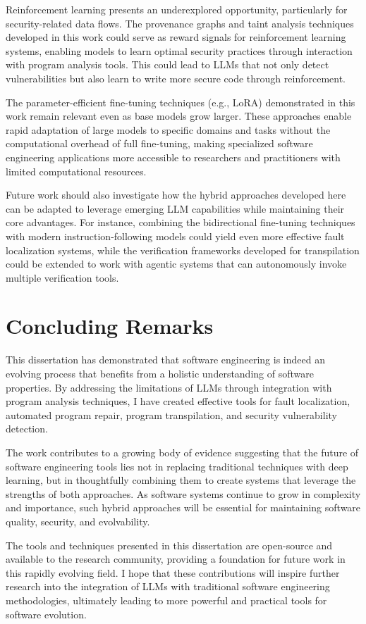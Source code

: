 Reinforcement learning presents an underexplored opportunity, particularly for security-related data flows. The provenance graphs and taint analysis techniques developed in this work could serve as reward signals for reinforcement learning systems, enabling models to learn optimal security practices through interaction with program analysis tools. This could lead to LLMs that not only detect vulnerabilities but also learn to write more secure code through reinforcement.

The parameter-efficient fine-tuning techniques (e.g., LoRA) demonstrated in this work remain relevant even as base models grow larger. These approaches enable rapid adaptation of large models to specific domains and tasks without the computational overhead of full fine-tuning, making specialized software engineering applications more accessible to researchers and practitioners with limited computational resources.

Future work should also investigate how the hybrid approaches developed here can be adapted to leverage emerging LLM capabilities while maintaining their core advantages. For instance, combining the bidirectional fine-tuning techniques with modern instruction-following models could yield even more effective fault localization systems, while the verification frameworks developed for transpilation could be extended to work with agentic systems that can autonomously invoke multiple verification tools.

\section{Concluding Remarks}

This dissertation has demonstrated that software engineering is indeed an evolving process that benefits from a holistic understanding of software properties. By addressing the limitations of LLMs through integration with program analysis techniques, I have created effective tools for fault localization, automated program repair, program transpilation, and security vulnerability detection.

The work contributes to a growing body of evidence suggesting that the future of software engineering tools lies not in replacing traditional techniques with deep learning, but in thoughtfully combining them to create systems that leverage the strengths of both approaches. As software systems continue to grow in complexity and importance, such hybrid approaches will be essential for maintaining software quality, security, and evolvability.

The tools and techniques presented in this dissertation are open-source and available to the research community, providing a foundation for future work in this rapidly evolving field. I hope that these contributions will inspire further research into the integration of LLMs with traditional software engineering methodologies, ultimately leading to more powerful and practical tools for software evolution.
